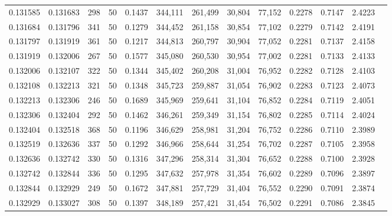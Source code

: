 \begin{tabular}{rrrrrrrrrrrrr}
0.131585 & 0.131683 &   298 &  50 &                                     0.1437 & 344,111 & 261,499 &  30,804 &  77,152 & 0.2278 & 0.7147 & 2.4223 \\
0.131684 & 0.131796 &   341 &  50 &                                     0.1279 & 344,452 & 261,158 &  30,854 &  77,102 & 0.2279 & 0.7142 & 2.4191 \\
0.131797 & 0.131919 &   361 &  50 &                                     0.1217 & 344,813 & 260,797 &  30,904 &  77,052 & 0.2281 & 0.7137 & 2.4158 \\
0.131919 & 0.132006 &   267 &  50 &                                     0.1577 & 345,080 & 260,530 &  30,954 &  77,002 & 0.2281 & 0.7133 & 2.4133 \\
0.132006 & 0.132107 &   322 &  50 &                                     0.1344 & 345,402 & 260,208 &  31,004 &  76,952 & 0.2282 & 0.7128 & 2.4103 \\
0.132108 & 0.132213 &   321 &  50 &                                     0.1348 & 345,723 & 259,887 &  31,054 &  76,902 & 0.2283 & 0.7123 & 2.4073 \\
0.132213 & 0.132306 &   246 &  50 &                                     0.1689 & 345,969 & 259,641 &  31,104 &  76,852 & 0.2284 & 0.7119 & 2.4051 \\
0.132306 & 0.132404 &   292 &  50 &                                     0.1462 & 346,261 & 259,349 &  31,154 &  76,802 & 0.2285 & 0.7114 & 2.4024 \\
0.132404 & 0.132518 &   368 &  50 &                                     0.1196 & 346,629 & 258,981 &  31,204 &  76,752 & 0.2286 & 0.7110 & 2.3989 \\
0.132519 & 0.132636 &   337 &  50 &                                     0.1292 & 346,966 & 258,644 &  31,254 &  76,702 & 0.2287 & 0.7105 & 2.3958 \\
0.132636 & 0.132742 &   330 &  50 &                                     0.1316 & 347,296 & 258,314 &  31,304 &  76,652 & 0.2288 & 0.7100 & 2.3928 \\
0.132742 & 0.132844 &   336 &  50 &                                     0.1295 & 347,632 & 257,978 &  31,354 &  76,602 & 0.2289 & 0.7096 & 2.3897 \\
0.132844 & 0.132929 &   249 &  50 &                                     0.1672 & 347,881 & 257,729 &  31,404 &  76,552 & 0.2290 & 0.7091 & 2.3874 \\
0.132929 & 0.133027 &   308 &  50 &                                     0.1397 & 348,189 & 257,421 &  31,454 &  76,502 & 0.2291 & 0.7086 & 2.3845 \\

\end{tabular}

